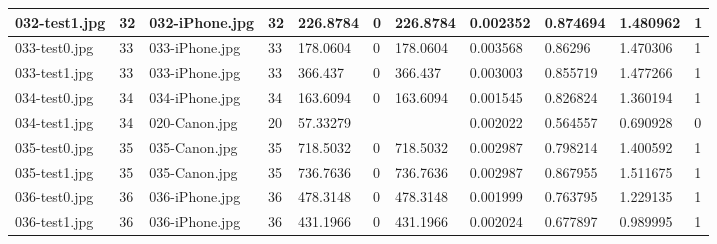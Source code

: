 \begin{landscape}
\begin{longtable}{|p{2cm}|p{1cm}|p{2cm}|p{1cm}|p{2cm}|p{1cm}|p{2cm}|p{2cm}|p{2cm}|p{2cm}|p{1cm}|}
		032-test1.jpg   & 32               & 032-iPhone.jpg        & 32                          & 226.8784              & 0                       & 226.8784                   & 0.002352              & 0.874694              & 1.480962                 & 1                \\ \hline
		033-test0.jpg   & 33               & 033-iPhone.jpg        & 33                          & 178.0604              & 0                       & 178.0604                   & 0.003568              & 0.86296               & 1.470306                 & 1                \\ \hline
		033-test1.jpg   & 33               & 033-iPhone.jpg        & 33                          & 366.437               & 0                       & 366.437                    & 0.003003              & 0.855719              & 1.477266                 & 1                \\ \hline
		034-test0.jpg   & 34               & 034-iPhone.jpg        & 34                          & 163.6094              & 0                       & 163.6094                   & 0.001545              & 0.826824              & 1.360194                 & 1                \\ \hline
		034-test1.jpg   & 34               & 020-Canon.jpg         & 20                          & 57.33279              &                         &                            & 0.002022              & 0.564557              & 0.690928                 & 0                \\ \hline
		035-test0.jpg   & 35               & 035-Canon.jpg         & 35                          & 718.5032              & 0                       & 718.5032                   & 0.002987              & 0.798214              & 1.400592                 & 1                \\ \hline
		035-test1.jpg   & 35               & 035-Canon.jpg         & 35                          & 736.7636              & 0                       & 736.7636                   & 0.002987              & 0.867955              & 1.511675                 & 1                \\ \hline
		036-test0.jpg   & 36               & 036-iPhone.jpg        & 36                          & 478.3148              & 0                       & 478.3148                   & 0.001999              & 0.763795              & 1.229135                 & 1                \\ \hline
		036-test1.jpg   & 36               & 036-iPhone.jpg        & 36                          & 431.1966              & 0                       & 431.1966                   & 0.002024              & 0.677897              & 0.989995                 & 1                \\ \hline

\end{longtable}
\end{landscape}
